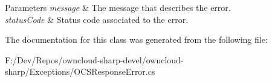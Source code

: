 \begin{DoxyParams}{Parameters}
{\em message} & The message that describes the error.\\
\hline
{\em status\+Code} & Status code associated to the error.\\
\hline
\end{DoxyParams}


The documentation for this class was generated from the following file\+:\begin{DoxyCompactItemize}
\item 
F\+:/\+Dev/\+Repos/owncloud-\/sharp-\/devel/owncloud-\/sharp/\+Exceptions/O\+C\+S\+Response\+Error.\+cs\end{DoxyCompactItemize}
